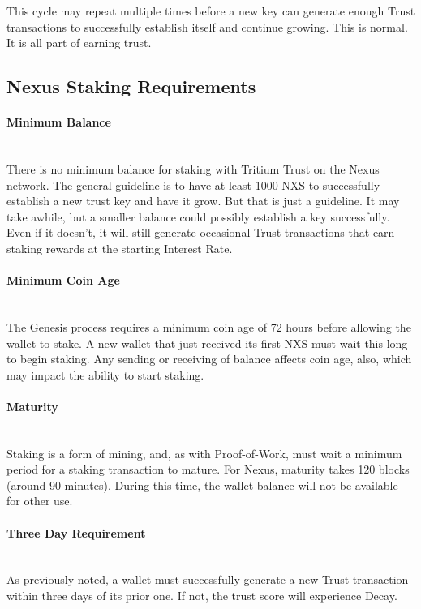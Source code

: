 \documentclass[11pt]{article}
\begin{document}
\noindent This cycle may repeat multiple times before a new key can generate enough Trust transactions to successfully establish itself and continue growing. This is normal. It is all part of earning trust.\\

\subsection{Nexus Staking Requirements}

\paragraph{Minimum Balance} ~\\
There is no minimum balance for staking with Tritium Trust on the Nexus network. The general guideline is to have at least 1000 NXS to successfully establish a new trust key and have it grow. But that is just a guideline. It may take awhile, but a smaller balance could possibly establish a key successfully. Even if it doesn’t, it will still generate occasional Trust transactions that earn staking rewards at the starting Interest Rate.

\paragraph{Minimum Coin Age} ~\\
The Genesis process requires a minimum coin age of 72 hours before allowing the wallet to stake. A new wallet that just received its first NXS must wait this long to begin staking. Any sending or receiving of balance affects coin age, also, which may impact the ability to start staking. 

\paragraph{Maturity} ~\\
Staking is a form of mining, and, as with Proof-of-Work, must wait a minimum period for a staking transaction to mature. For Nexus, maturity takes 120 blocks (around 90 minutes). During this time, the wallet balance will not be available for other use. 

\paragraph{Three Day Requirement} ~\\
As previously noted, a wallet must successfully generate a new Trust transaction within three days of its prior one. If not, the trust score will experience Decay. \\
\end{document}
